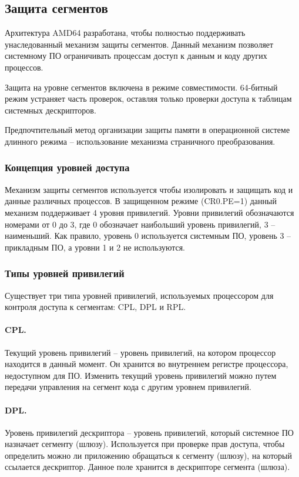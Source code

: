 \subsection{Защита сегментов}
Архитектура AMD64 разработана, чтобы полностью поддерживать унаследованный механизм защиты сегментов.
Данный механизм позволяет системному ПО ограничивать процессам доступ к данным и коду других процессов.

Защита на уровне сегментов включена в режиме совместимости. 64-битный режим устраняет часть проверок,
оставляя только проверки доступа к таблицам системных дескрипторов.

Предпочтительный метод организации защиты памяти в операционной системе длинного режима -- использование
механизма страничного преобразования.

\subsubsection*{Концепция уровней доступа}
Механизм защиты сегментов используется чтобы изолировать и защищать код и данные различных процессов. В защищенном
режиме (CR0.PE=1) данный механизм поддерживает 4 уровня привилегий. Уровни привилегий обозначаются номерами от 0 до 3,
где 0 обозначает наибольший уровень привилегий, 3 -- наименьший. Как правило, уровень 0 используется системным ПО,
уровень 3 -- прикладным ПО, а уровни 1 и 2 не используются.

\subsubsection*{Типы уровней привилегий}
Существует три типа уровней привилегий, используемых процессором для контроля доступа к сегментам: CPL, DPL и RPL.

\paragraph{CPL.} Текущий уровень привилегий -- уровень привилегий, на котором процессор находится в данный
момент. Он хранится во внутреннем регистре процессора, недоступном для ПО. Изменить текущий уровень привилегий
можно путем передачи управления на сегмент кода с другим уровнем привилегий.

\paragraph{DPL.} Уровень привилегий дескриптора -- уровень привилегий, который системное ПО назначает сегменту (шлюзу).
Используется при проверке прав доступа, чтобы определить можно ли приложению обращаться к сегменту (шлюзу), на который
ссылается дескриптор. Данное поле хранится в дескрипторе сегмента (шлюза).

